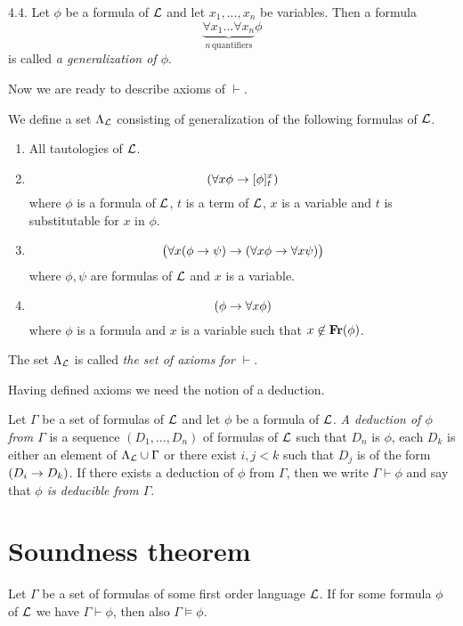 \begin{definition} 4.4. Let $\phi$ be a formula of ${\mathcal L}$ and let $x_1,...,x_n$ be variables. Then a formula
$$\underbrace{\forall x_1 ...\forall x_n}_{n\,\mathrm{quantifiers}} \phi$$
is called \textit{a generalization of $\phi$}.
\end{definition}
\noindent
Now we are ready to describe axioms of $\vdash$.

\begin{definition}
We define a set $\Lambda_{{\mathcal L}}$ consisting of generalization of the following formulas of ${\mathcal L}$.
\begin{enumerate}[label=\textbf{(\arabic*)}, leftmargin=3.0em]
\item All tautologies of ${\mathcal L}$.
\item
$$\left(\forall x\phi \rightarrow [\phi]^x_t\right)$$
where $\phi$ is a formula of ${\mathcal L}$, $t$ is a term of ${\mathcal L}$, $x$ is a variable and $t$ is substitutable for $x$ in $\phi$.
\item
$$\big(\forall x(\phi \rightarrow \psi) \rightarrow (\forall x\phi \rightarrow \forall x\psi)\big)$$
where $\phi, \psi$ are formulas of ${\mathcal L}$ and $x$ is a variable.
\item
$$(\phi \rightarrow \forall x\phi)$$
where $\phi$ is a formula and $x$ is a variable such that $x \not \in \mathbf{Fr}(\phi)$.
\end{enumerate}
The set $\Lambda_{\mathcal L}$ is called \textit{the set of axioms for $\vdash$}.
\end{definition}
\noindent
Having defined axioms we need the notion of a deduction.

\begin{definition}
Let $\Gamma$ be a set of formulas of ${\mathcal L}$ and let $\phi$ be a formula of ${\mathcal L}$. \textit{A deduction of $\phi$ from $\Gamma$} is a sequence $(D_1 , ..., D_n)$ of formulas of ${\mathcal L}$ such that $D_n$ is $\phi$, each $D_k$ is either an element of $\Lambda_{\mathcal L} \cup \Gamma$ or there exist $i, j < k$ such that $D_j$ is of the form $(D_i \rightarrow D_k)$. If there exists a deduction of $\phi$ from $\Gamma$, then we write $\Gamma \vdash \phi$ and say that \textit{$\phi$ is deducible from $\Gamma$}.
\end{definition}

\section{Soundness theorem}

\begin{theorem}\label{theorem:soundness_theorem}
Let $\Gamma$ be a set of formulas of some first order language ${\mathcal L}$. If for some formula $\phi$ of ${\mathcal L}$ we have $\Gamma \vdash \phi$, then also $\Gamma \vDash \phi$.
\end{theorem}

